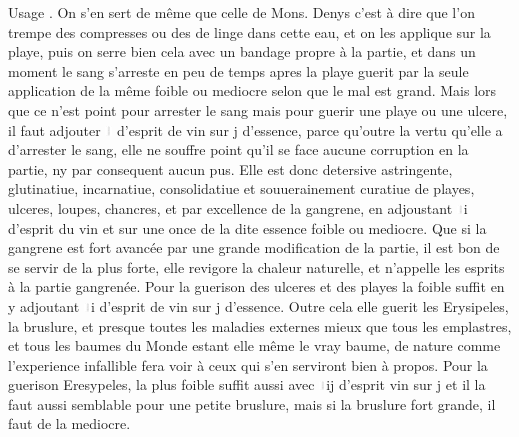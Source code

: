 \pend%
\pstart%
Usage . On s'en sert de m\^{e}me que celle de Mons. Denys\protect{} c'est \`{a} dire que l'on trempe des compresses ou des  de linge dans cette eau, et on les applique sur la playe, puis on serre bien cela avec un bandage propre \`{a} la partie, et dans un moment le sang s'arreste en peu de temps apres la playe guerit par la seule application de la m\^{e}me foible ou mediocre selon que le mal est grand. Mais lors que ce n'est point pour arrester le sang mais pour guerir une playe ou une ulcere, il faut adjouter \includegraphics[width=0.014\textwidth]{images/uncia.pdf} d'esprit de vin sur \Pfund j d'essence, parce qu'outre la vertu qu'elle a d'arrester le sang, elle ne souffre point qu'il se face aucune corruption en la partie, ny par consequent aucun pus.
\pend%
\pstart%
Elle est donc detersive astringente, glutinatiue, incarnatiue, consolidatiue et souuerainement curatiue de playes, ulceres, loupes, chancres, et par excellence de la gangrene, en adjoustant \includegraphics[width=0.014\textwidth]{images/uncia.pdf}i d'esprit du vin et sur une once de la dite essence foible ou mediocre. Que si la gangrene est fort  avanc\'{e}e par une grande modification de la partie, il est bon de se servir de la plus forte, elle revigore la chaleur naturelle, et n'appelle les esprits \`{a} la partie gangren\'{e}e. Pour la guerison des ulceres et des playes la foible suffit en y adjoutant \includegraphics[width=0.014\textwidth]{images/uncia.pdf}i d'esprit de vin sur \Pfund j d'essence.
\pend%
\pstart%
Outre cela elle guerit les Erysipeles, la bruslure, et presque toutes les maladies externes mieux que tous les emplastres, et tous les baumes du Monde estant elle m\^{e}me le vray baume, de nature comme l'experience infallible fera voir \`{a} ceux qui s'en serviront bien \`{a} propos. Pour la guerison  Eresypeles, la plus foible suffit aussi avec \includegraphics[width=0.014\textwidth]{images/uncia.pdf}ij d'esprit  vin sur \Pfund j et il la faut aussi semblable pour une petite bruslure, mais si la bruslure  fort grande, il faut de la mediocre.
